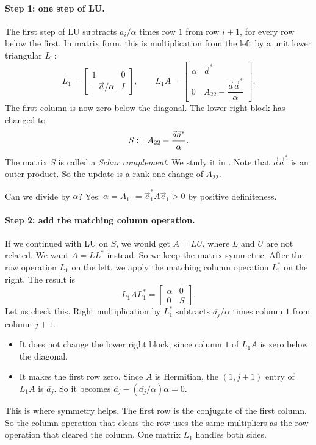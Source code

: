 \paragraph{Step 1: one step of LU.} The first step of LU subtracts $a_i/\alpha$ times row $1$ from row $i + 1$, for every row below the first. In matrix form, this is multiplication from the left by a unit lower triangular $L_1$:
\begin{equation}
  L_1 = \begin{bmatrix} 1 & 0 \\ -\vec{a}/\alpha & I \end{bmatrix}, \qquad
  L_1A = \begin{bmatrix} \alpha & \vec{a}^\ast \\ 0 & A_{22} - \dfrac{\vec{a}\vec{a}^\ast}{\alpha} \end{bmatrix}.
\end{equation}
The first column is now zero below the diagonal. The lower right block has changed to
\begin{equation}
  S \coloneqq A_{22} - \frac{\vec{a}\vec{a}^\ast}{\alpha}.
\end{equation}
The matrix $S$ is called a \emph{Schur complement}. We study it in . Note that $\vec{a}\vec{a}^\ast$ is an outer product. So the update is a rank-one change of $A_{22}$.

Can we divide by $\alpha$? Yes: $\alpha = A_{11} = \vec{e}_1^\ast A\vec{e}_1 > 0$ by positive definiteness.

\paragraph{Step 2: add the matching column operation.} If we continued with LU on $S$, we would get $A = LU$, where $L$ and $U$ are not related. We want $A = LL^\ast$ instead. So we keep the matrix symmetric. After the row operation $L_1$ on the left, we apply the matching column operation $L_1^\ast$ on the right. The result is
\begin{equation}
  L_1AL_1^\ast = \begin{bmatrix} \alpha & 0 \\ 0 & S \end{bmatrix}.
\end{equation}
Let us check this. Right multiplication by $L_1^\ast$ subtracts $\overline{a_j}/\alpha$ times column $1$ from column $j + 1$.
\begin{itemize}
  \item It does not change the lower right block, since column $1$ of $L_1A$ is zero below the diagonal.
  \item It makes the first row zero. Since $A$ is Hermitian, the $(1, j + 1)$ entry of $L_1A$ is $\overline{a_j}$. So it becomes $\overline{a_j} - (\overline{a_j}/\alpha)\alpha = 0$.
\end{itemize}
This is where symmetry helps. The first row is the conjugate of the first column. So the column operation that clears the row uses the same multipliers as the row operation that cleared the column. One matrix $L_1$ handles both sides.

